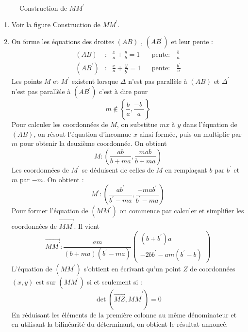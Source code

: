 \begin{figure}
	\begin{center}
	
	\end{center}
\caption{Construction de $MM^\prime$}
\end{figure} 
\begin{enumerate}
 \item Voir la figure Construction de $MM^\prime$.
 \item On forme les équations des droites $(AB)$ , $(AB^\prime)$ et leur pente :
\begin{align*}
 (AB) & :&   \frac{x}{a} + \frac{y}{b}=1  &    & \mathrm {pente : }  &    \frac{b}{a}    \\
 (AB^\prime) & : &   \frac{x}{a} + \frac{y}{b^\prime}=1  &    & \mathrm {pente : }  &    \frac{b^\prime}{a}
\end{align*}
Les points $M$ et $M^\prime$ existent lorsque $\Delta$ n'est pas parallèle à $(AB)$ et $\Delta ^\prime$ n'est pas parallèle à  $(AB^\prime)$ c'est à dire pour
\begin{displaymath}
 m\not\in \left\lbrace \frac{b}{a}, \frac{-b^\prime}{a}\right\rbrace 
\end{displaymath}
Pour calculer les coordonnées de $M$, on substitue $mx$ à $y$ dans l'équation de $(AB)$, on résout l'équation d'inconnue $x$ ainsi formée, puis on multiplie par $m$ pour obtenir la deuxième coordonnée. On obtient
\begin{displaymath}
 M : \left( \frac{ab}{b+ma} , \frac{mab}{b+ma}\right) 
\end{displaymath}
Les coordonnées de $M^\prime$ se déduisent de celles de $M$ en remplaçant $b$ par $b^\prime$ et $m$ par $-m$. On obtient :
\begin{displaymath}
 M^\prime : \left( \frac{ab^\prime}{b^\prime - ma} , \frac{-mab^\prime}{b^\prime -ma}\right) 
\end{displaymath}
Pour former l'équation de $(MM^\prime)$ on commence par calculer et simplifier les coordonnées de $\overrightarrow{MM^\prime}$. Il vient
\begin{displaymath}
 \overrightarrow{MM^\prime} : \frac{am}{(b+ma)(b^\prime - ma)}
\left( 
\begin{array}{c}
 (b+b^\prime)a \\
 -2bb^\prime -am(b^\prime -b)
\end{array}
\right) 
\end{displaymath}
L'équation de $(MM^\prime)$ s'obtient en écrivant qu'un point $Z$ de coordonnées $(x,y)$ est sur $(MM^\prime)$ si et seulement si :
\begin{displaymath}
 \det (\overrightarrow{MZ},\overrightarrow{MM^\prime})=0
\end{displaymath}
En réduisant les éléments de la première colonne au même dénominateur et en utilisant la bilinéarité du déterminant, on obtient le résultat annoncé.


\end{enumerate}
